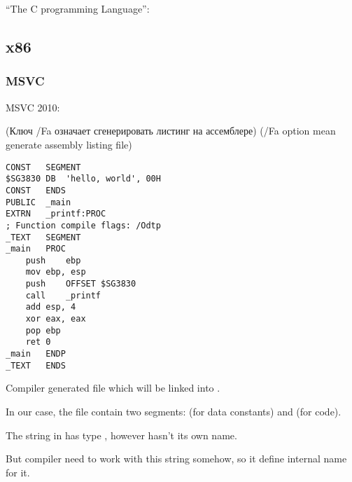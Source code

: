 ﻿\section{\HelloWorldSectionName}
\label{sec:helloworld}

 ``The C programming Language''\cite{Kernighan:1988:CPL:576122}:



\subsection{x86}

\subsubsection{MSVC}

 MSVC 2010: 

\IFRU
{(Ключ /Fa означает сгенерировать листинг на ассемблере)}
{(/Fa option mean generate assembly listing file)}

\begin{lstlisting}[caption=MSVC 2010]
CONST	SEGMENT
$SG3830	DB	'hello, world', 00H
CONST	ENDS
PUBLIC	_main
EXTRN	_printf:PROC
; Function compile flags: /Odtp
_TEXT	SEGMENT
_main	PROC
	push	ebp
	mov	ebp, esp
	push	OFFSET $SG3830
	call	_printf
	add	esp, 4
	xor	eax, eax
	pop	ebp
	ret	0
_main	ENDP
_TEXT	ENDS
\end{lstlisting}

{Compiler generated  file which will be linked into .}

{In our case, the file contain two segments:  (for data constants) and  (for code).} 

{The string  in \CCpp has type , however hasn't its own name.}

{But compiler need to work with this string somehow, so it define internal name  for it.}

